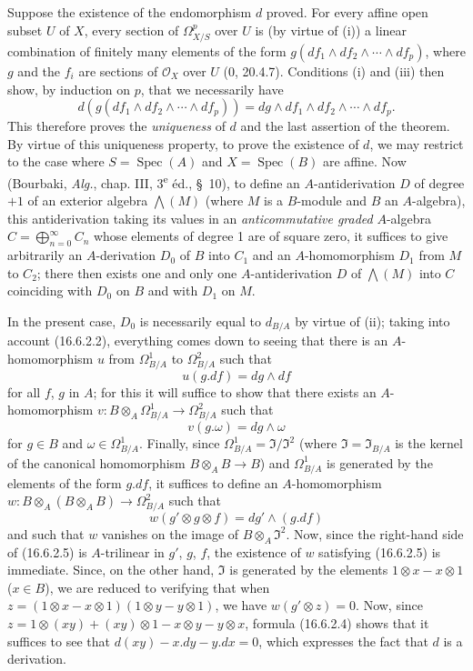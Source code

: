Suppose the existence of the endomorphism $d$ proved. For every affine open
subset $U$ of $X$, every section of $\Omega_{X/S}^p$ over $U$ is (by virtue
of (i)) a linear combination of finitely many elements of the form
$g(df_1\wedge df_2\wedge\cdots\wedge df_p)$, where $g$ and the $f_i$ are
sections of $\mathcal{O}_X$ over $U$ (0, 20.4.7). Conditions (i)
and (iii) then show, by induction on $p$, that we necessarily have
\[
  d(g(df_1\wedge df_2\wedge\cdots\wedge df_p))
  =dg\wedge df_1\wedge df_2\wedge\cdots\wedge df_p.
  \tag{16.6.2.2}
  \label{IV.16.6.2.2}
\]
This therefore proves the \emph{uniqueness} of $d$ and the last assertion of the
theorem. By virtue of this uniqueness property, to prove the existence of $d$, we
may restrict to the case where $S=\operatorname{Spec}(A)$ and
$X=\operatorname{Spec}(B)$ are affine. Now (Bourbaki, \emph{Alg.}, chap.
III, 3\textsuperscript{e} éd., \S~10), to define an $A$-antiderivation
$D$ of degree $+1$ of an exterior algebra $\bigwedge(M)$ (where $M$ is a
$B$-module and $B$ an $A$-algebra), this antiderivation taking its values
in an \emph{anticommutative graded} $A$-algebra
$C=\bigoplus_{n=0}^{\infty}C_n$ whose elements of degree 1 are of square
zero, it suffices to give arbitrarily an $A$-derivation $D_0$ of $B$
into $C_1$ and an $A$-homomorphism $D_1$ from $M$ to $C_2$; there then exists
one and only one $A$-antiderivation $D$ of $\bigwedge(M)$ into $C$
coinciding with $D_0$ on $B$ and with $D_1$ on $M$.

In the present case, $D_0$ is necessarily equal to $d_{B/A}$ by virtue of
(ii); taking into account (16.6.2.2), everything comes down to seeing that there
is an $A$-homomorphism $u$ from $\Omega_{B/A}^1$ to $\Omega_{B/A}^2$ such that
\[
  u(g.df)=dg\wedge df
  \tag{16.6.2.3}
  \label{IV.16.6.2.3}
\]
for all $f$, $g$ in $A$; for this it will suffice to show that there
exists an $A$-homomorphism
$v:B\otimes_A\Omega_{B/A}^1\to\Omega_{B/A}^2$ such that
\[
  v(g.\omega)=dg\wedge\omega
  \tag{16.6.2.4}
  \label{IV.16.6.2.4}
\]
for $g\in B$ and $\omega\in\Omega_{B/A}^1$. Finally, since
$\Omega_{B/A}^1=\mathfrak{I}/\mathfrak{I}^2$ (where
$\mathfrak{I}=\mathfrak{I}_{B/A}$ is the kernel of the canonical homomorphism
$B\otimes_A B\to B$) and $\Omega_{B/A}^1$ is generated by the elements
of the form $g.df$, it suffices to define an $A$-homomorphism
$w:B\otimes_A(B\otimes_A B)\to\Omega_{B/A}^2$ such that
\[
  w(g'\otimes g\otimes f)=dg'\wedge(g.df)
  \tag{16.6.2.5}
  \label{IV.16.6.2.5}
\]
and such that $w$ vanishes on the image of $B\otimes_A\mathfrak{I}^2$. Now,
since the right-hand side of (16.6.2.5) is $A$-trilinear in $g'$, $g$, $f$,
the existence of $w$ satisfying (16.6.2.5) is immediate. Since, on the other hand,
$\mathfrak{I}$ is generated by the elements $1\otimes x-x\otimes1$
($x\in B$), we are reduced to verifying that when
$z=(1\otimes x-x\otimes1)(1\otimes y-y\otimes1)$, we have
$w(g'\otimes z)=0$. Now, since
$z=1\otimes(xy)+(xy)\otimes1-x\otimes y-y\otimes x$, formula (16.6.2.4)
shows that it
suffices to see that $d(xy)-x.dy-y.dx=0$, which expresses the fact that $d$ is a
derivation.

